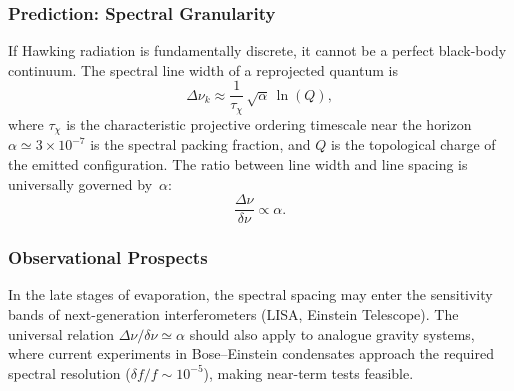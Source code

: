   \subsubsection*{Prediction: Spectral Granularity}
    \label{subsec:spectral-granularity}

    If Hawking radiation is fundamentally discrete, it cannot be a perfect
    black-body continuum.
    The spectral line width of a reprojected quantum is
    \begin{equation}
      \Delta \nu_k \approx
      \frac{1}{\tau_\chi}\, \sqrt{\alpha}\, \ln(Q),
    \end{equation}
    where $\tau_\chi$ is the characteristic projective ordering timescale
    near the horizon $\alpha \simeq 3 \times 10^{-7}$ is the spectral packing fraction,
    and $Q$ is the topological charge of the emitted configuration.
    The ratio between line width and line spacing is universally governed
    by~$\alpha$:
    \begin{equation}
      \frac{\Delta \nu}{\delta \nu} \propto \alpha .
    \end{equation}

  \subsubsection*{Observational Prospects}
    \label{subsec:observational-granularity}

    In the late stages of evaporation, the spectral spacing may enter the
    sensitivity bands of next-generation interferometers (LISA, Einstein
    Telescope).
    The universal relation $\Delta \nu / \delta \nu \simeq \alpha$ should
    also apply to analogue gravity systems, where current experiments in
    Bose--Einstein condensates approach the required spectral resolution
    ($\delta f / f \sim 10^{-5}$), making near-term tests feasible.
